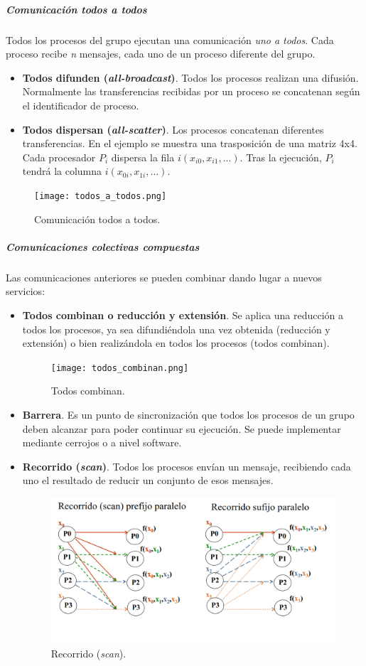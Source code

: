 \documentclass[12pt,spanish]{article}
\begin{document}
\subparagraph{Comunicación todos a todos}

Todos los procesos del grupo ejecutan una comunicación \emph{uno a todos}. Cada proceso recibe \textit{n} mensajes, cada uno de un proceso diferente del grupo.

\begin{itemize}
	\item \textbf{Todos difunden (\textit{all-broadcast})}. Todos los procesos realizan una difusión. Normalmente las transferencias recibidas por un proceso se concatenan según el identificador de proceso.
	\item \textbf{Todos dispersan (\textit{all-scatter})}. Los procesos concatenan diferentes transferencias. En el ejemplo se muestra una trasposición de una matriz 4x4. Cada procesador $P_i$ dispersa la fila $i(x_{i0},x_{i1},...)$. Tras la ejecución, $P_i$ tendrá la columna $i(x_{0i},x_{1i},...)$.
\end{itemize}

\begin{figure}[H]
\centering
\texttt{[image: todos\_a\_todos.png]}
\caption{Comunicación todos a todos.}
\end{figure}

\subparagraph{Comunicaciones colectivas compuestas}

Las comunicaciones anteriores se pueden combinar dando lugar a nuevos servicios:

\begin{itemize}
	\item \textbf{Todos combinan o reducción y extensión}. Se aplica una reducción a todos los procesos, ya sea difundiéndola una vez obtenida (reducción y extensión) o bien realizándola en todos los procesos (todos combinan).
	\begin{figure}[H]
		\centering
		\texttt{[image: todos\_combinan.png]}
		\caption{Todos combinan.}
	\end{figure}
	\item \textbf{Barrera}. Es un punto de sincronización que todos los procesos de un grupo deben alcanzar para poder continuar su ejecución. Se puede implementar mediante cerrojos o a nivel software.
	\item \textbf{Recorrido (\textit{scan})}. Todos los procesos envían un mensaje, recibiendo cada uno el resultado de reducir un conjunto de esos mensajes.
	\begin{figure}[H]
		\centering
		\includegraphics[scale=0.3]{scan.png}
		\caption{Recorrido (\textit{scan}).}
	\end{figure}
\end{itemize}
	
\end{document}
